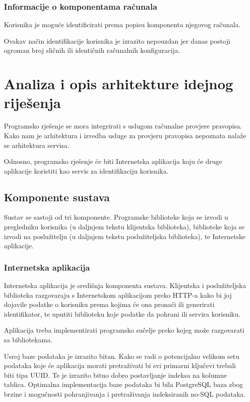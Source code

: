 \documentclass[times, utf8, zavrsni]{fer}
\begin{document}
\subsection{Informacije o komponentama računala}
Korisnika je moguće identificirati prema popisu komponenta njegovog
računala.

Ovakav način identifikacije korisnika je izrazito nepouzdan jer danas
postoji ogroman broj sličnih ili identičnih računalnih konfiguracija.

\chapter{Analiza i opis arhitekture idejnog riješenja}
Programsko rješenje se mora integrirati s uslugom računalne provjere
pravopisa. Kako nam je arhitektura i izvedba usluge za provjeru pravopisa
nepoznata nalaže se arhitektura servisa.

Odnosno, programsko rješenje će biti Internetska aplikacija koju će druge
aplikacije koristiti kao servis za identifikaciju korisnika.

\section{Komponente sustava}
Sustav se sastoji od tri komponente. Programske biblioteke koja se izvodi u
pregledniku korisnika (u daljnjem tekstu klijentska biblioteka),
biblioteke koja se izvodi na poslužitelju (u daljnjem tekstu poslužiteljska
biblioteka), te Internetske aplikacije.

\subsection{Internetska aplikacija}
Internetska aplikacija je središnja komponenta sustava. Klijentska i
poslužiteljska biblioteka razgovaraju s Internetskom aplikacijom preko HTTP-a
kako bi joj dojavile podatke o korisniku prema kojima će ona pronaći ili
generirati identifikator, te uputiti biblioteku koje podatke da pohrani ili
servira korisniku.

Aplikacija treba implementirati programsko sučelje preko kojeg može razgovarati
sa bibliotekama.

Usroj baze podataka je izrazito bitan. Kako se radi o potencijalno velikom setu
podataka koje će aplikacija morati pretraživati bi svi primarni ključevi trebali
biti tipa UUID. Te je izrazito bitno dobro postavljanje indeksa na kolumne
tablica. Optimalna implementacija baze podataka bi bila PostgreSQL baza zbog
brzine i mogučnosti pohranjivanja i pretraživanja indeksiranih no-SQL podataka.
\end{document}

